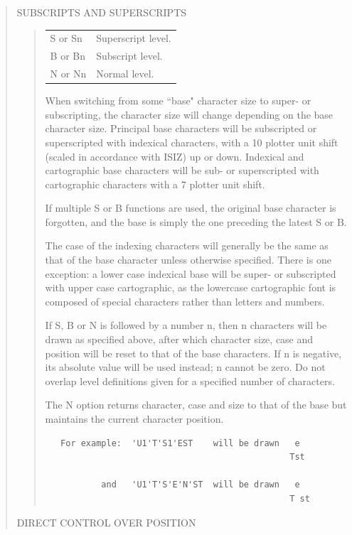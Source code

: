 \documentclass[twoside,11pt]{article}
\renewcommand{\_}{\texttt{\symbol{95}}}
\begin{document}
\begin{quote}
SUBSCRIPTS AND SUPERSCRIPTS

\begin{quote}
\begin{tabular}{ll}
S or Sn & Superscript level.\\
B or Bn & Subscript level.\\
N or Nn & Normal level.
\end{tabular}

When switching from some ``base" character size to super- or
subscripting, the character size will change depending on
the base character size.  Principal base characters will be
subscripted or superscripted with indexical characters, with
a 10 plotter unit shift (scaled in accordance with ISIZ) up
or down.  Indexical and cartographic base characters will be
sub- or superscripted with cartographic characters with a
7 plotter unit shift.

If multiple S or B functions are used, the original base
character is forgotten, and the base is simply the one
preceding the latest S or B.

The case of the indexing characters will generally be the
same as that of the base character unless otherwise specified.
There is one exception: a lower case indexical base will be
super- or subscripted with upper case cartographic, as the
lowercase cartographic font is composed of special characters
rather than letters and numbers.

If S, B or N is followed by a number n, then n characters will
be drawn as specified above, after which character size, case
and position will be reset to that of the base characters.
If n is negative, its absolute value will be used instead;  n
cannot be zero.  Do not overlap level definitions given for a
specified number of characters.

The N option returns character, case and size to that of the
base but maintains the current character position.

\begin{verbatim}
   For example:  'U1'T'S1'EST    will be drawn   e
                                                Tst

           and   'U1'T'S'E'N'ST  will be drawn   e
                                                T st
\end{verbatim}
\end{quote}

DIRECT CONTROL OVER POSITION


\end{quote}
\end{document}
